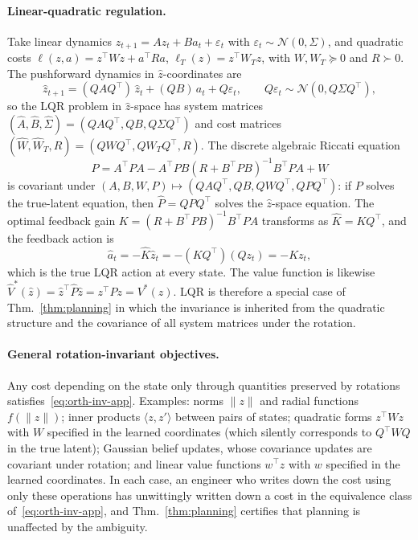 \paragraph{Linear-quadratic regulation.}
Take linear dynamics $z_{t+1} = A z_t + B a_t + \varepsilon_t$ with $\varepsilon_t \sim \mathcal{N}(0, \Sigma)$, and quadratic costs $\ell(z,a) = z^\top W z + a^\top R a$, $\ell_T(z) = z^\top W_T z$, with $W, W_T \succeq 0$ and $R \succ 0$.
The pushforward dynamics in $\hat z$-coordinates are
\begin{equation}
    \hat z_{t+1} = (Q A Q^\top)\,\hat z_t + (Q B)\,a_t + Q\varepsilon_t, \qquad Q\varepsilon_t \sim \mathcal{N}(0, Q\Sigma Q^\top),
\end{equation}
so the LQR problem in $\hat z$-space has system matrices $(\hat A, \hat B, \hat\Sigma) = (QAQ^\top, QB, Q\Sigma Q^\top)$ and cost matrices $(\hat W, \hat W_T, R) = (QWQ^\top, QW_T Q^\top, R)$. The discrete algebraic Riccati equation
\begin{equation}
    P = A^\top P A - A^\top P B (R + B^\top P B)^{-1} B^\top P A + W
\end{equation}
is covariant under $(A, B, W, P) \mapsto (QAQ^\top, QB, QWQ^\top, QPQ^\top)$: if $P$ solves the true-latent equation, then $\hat P = QPQ^\top$ solves the $\hat z$-space equation. The optimal feedback gain $K = (R + B^\top P B)^{-1} B^\top P A$ transforms as $\hat K = KQ^\top$, and the feedback action is
\begin{equation}
    \hat a_t = -\hat K \hat z_t = -(K Q^\top)(Q z_t) = -K z_t,
\end{equation}
which is the true LQR action at every state. The value function is likewise $\hat V^*(\hat z) = \hat z^\top \hat P \hat z = z^\top P z = V^*(z)$. LQR is therefore a special case of Thm.~\ref{thm:planning} in which the invariance is inherited from the quadratic structure and the covariance of all system matrices under the rotation.

\paragraph{General rotation-invariant objectives.}
Any cost depending on the state only through quantities preserved by rotations satisfies~\eqref{eq:orth-inv-app}. Examples: norms $\|z\|$ and radial functions $f(\|z\|)$; inner products $\langle z, z' \rangle$ between pairs of states; quadratic forms $z^\top W z$ with $W$ specified in the learned coordinates (which silently corresponds to $Q^\top W Q$ in the true latent); Gaussian belief updates, whose covariance updates are covariant under rotation; and linear value functions $w^\top z$ with $w$ specified in the learned coordinates. In each case, an engineer who writes down the cost using only these operations has unwittingly written down a cost in the equivalence class of~\eqref{eq:orth-inv-app}, and Thm.~\ref{thm:planning} certifies that planning is unaffected by the ambiguity.

